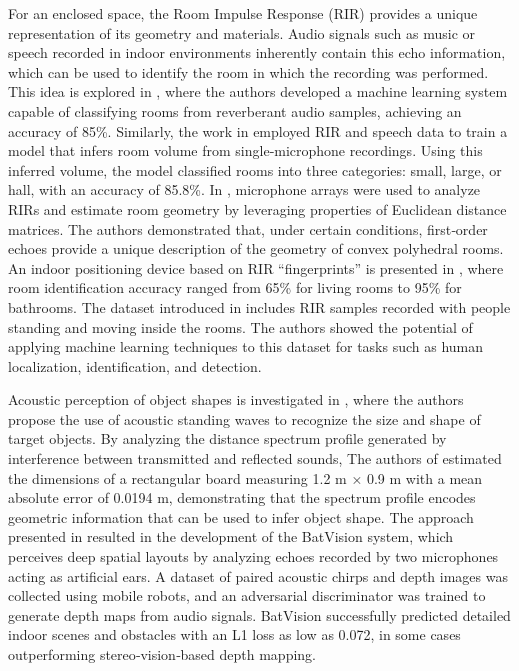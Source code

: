 \documentclass[conference]{IEEEtran}
\begin{document}
For an enclosed space, the Room Impulse Response (RIR) provides a unique representation of its geometry and materials. Audio signals such as music or speech recorded in indoor environments inherently contain this echo information, which can be used to identify the room in which the recording was performed. This idea is explored in \cite{RIR05}, where the authors developed a machine learning system capable of classifying rooms from reverberant audio samples, achieving an accuracy of 85\%. Similarly, the work in \cite{RIR06} employed RIR and speech data to train a model that infers room volume from single‑microphone recordings. Using this inferred volume, the model classified rooms into three categories: small, large, or hall, with an accuracy of 85.8\%. In \cite{RIR07}, microphone arrays were used to analyze RIRs and estimate room geometry by leveraging properties of Euclidean distance matrices. The authors demonstrated that, under certain conditions, first‑order echoes provide a unique description of the geometry of convex polyhedral rooms. An indoor positioning device based on RIR “fingerprints” is presented in \cite{RIR08}, where room identification accuracy ranged from 65\% for living rooms to 95\% for bathrooms. The dataset introduced in \cite{RIR09} includes RIR samples recorded with people standing and moving inside the rooms. The authors showed the potential of applying machine learning techniques to this dataset for tasks such as human localization, identification, and detection.

Acoustic perception of object shapes is investigated in \cite{shape1}, where the authors propose the use of acoustic standing waves to recognize the size and shape of target objects. By analyzing the distance spectrum profile generated by interference between transmitted and reflected sounds, The authors of \cite{shape1} estimated the dimensions of a rectangular board measuring 1.2 m × 0.9 m with a mean absolute error of 0.0194 m, demonstrating that the spectrum profile encodes geometric information that can be used to infer object shape. The approach presented in \cite{bat1} resulted in the development of the BatVision system, which perceives deep spatial layouts by analyzing echoes recorded by two microphones acting as artificial ears. A dataset of paired acoustic chirps and depth images was collected using mobile robots, and an adversarial discriminator was trained to generate depth maps from audio signals. BatVision successfully predicted detailed indoor scenes and obstacles with an L1 loss as low as 0.072, in some cases outperforming stereo‑vision‑based depth mapping.
\end{document}
